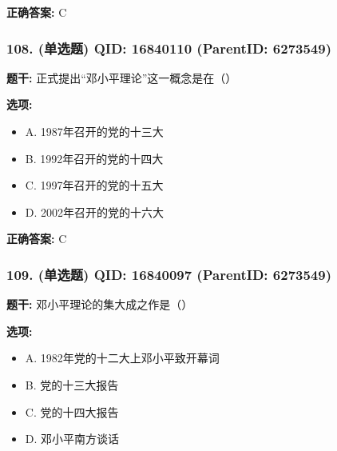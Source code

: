 \documentclass[12pt,UTF8]{ctexart}
\begin{document}
\textbf{正确答案:}
C

\vspace{0.3em}\hrulefill\vspace{0.7em}

\subsubsection*{108. (单选题) \small QID: 16840110 (ParentID: 6273549)}

\textbf{题干:}
正式提出“邓小平理论”这一概念是在（）



\textbf{选项:}
\begin{itemize}[leftmargin=*]

  \item A. 1987年召开的党的十三大

  \item B. 1992年召开的党的十四大

  \item C. 1997年召开的党的十五大

  \item D. 2002年召开的党的十六大

\end{itemize}

\textbf{正确答案:}
C

\vspace{0.3em}\hrulefill\vspace{0.7em}

\subsubsection*{109. (单选题) \small QID: 16840097 (ParentID: 6273549)}

\textbf{题干:}
邓小平理论的集大成之作是（）



\textbf{选项:}
\begin{itemize}[leftmargin=*]

  \item A. 1982年党的十二大上邓小平致开幕词

  \item B. 党的十三大报告

  \item C. 党的十四大报告

  \item D. 邓小平南方谈话

\end{itemize}
\end{document}
